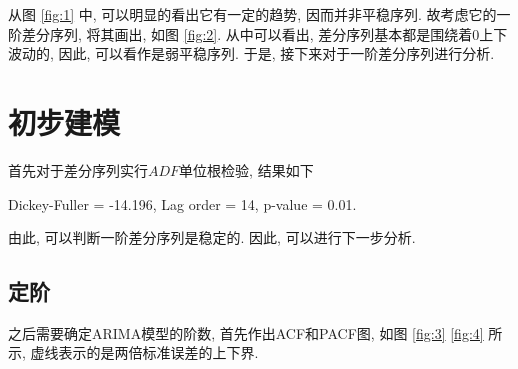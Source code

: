 \documentclass[11pt]{article}
\begin{document}
从图 \ref{fig:1} 中, 可以明显的看出它有一定的趋势, 因而并非平稳序列. 故考虑它的一阶差分序列, 将其画出, 如图 \ref{fig:2}. 从中可以看出, 差分序列基本都是围绕着0上下波动的, 因此, 可以看作是弱平稳序列. 于是, 接下来对于一阶差分序列进行分析. 
\section{初步建模}
\qquad 首先对于差分序列实行$ADF$单位根检验, 结果如下
\begin{center}
    Dickey-Fuller = -14.196, Lag order = 14, p-value = 0.01. 
\end{center}
由此, 可以判断一阶差分序列是稳定的. 因此, 可以进行下一步分析. 
\subsection{定阶}
\qquad 之后需要确定ARIMA模型的阶数, 首先作出ACF和PACF图, 如图 \ref{fig:3} \ref{fig:4} 所示, 虚线表示的是两倍标准误差的上下界. 
\end{document}
